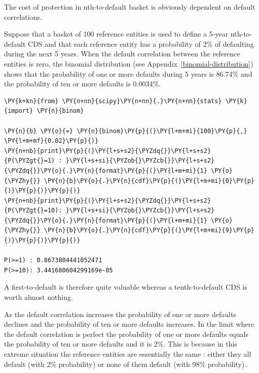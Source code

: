 The cost of protection in nth-to-default basket is obviously dependent on default correlations. 

Suppose that a basket of 100 reference entities is used to define a 5-year nth-to-default CDS and that each reference entity has a probability of 2\% of defaulting during the next
5 years. When the default correlation between the reference entities is zero, the binomial distribution (see Appendix~\ref{binomial-distribution}) 
shows that the probability of one or more defaults during 5 years is 86.74\% and the probability of ten or more defaults is 0.0034\%.

\begin{tcolorbox}[breakable, size=fbox, boxrule=1pt, pad at break*=1mm,colback=cellbackground, colframe=cellborder]
\begin{Verbatim}[commandchars=\\\{\}]
\PY{k+kn}{from} \PY{n+nn}{scipy}\PY{n+nn}{.}\PY{n+nn}{stats} \PY{k}{import} \PY{n}{binom}
	
\PY{n}{b} \PY{o}{=} \PY{n}{binom}\PY{p}{(}\PY{l+m+mi}{100}\PY{p}{,} \PY{l+m+mf}{0.02}\PY{p}{)}
\PY{n+nb}{print}\PY{p}{(}\PY{l+s+s2}{\PYZdq{}}\PY{l+s+s2}{P(\PYZgt{}=1) : }\PY{l+s+si}{\PYZob{}\PYZcb{}}\PY{l+s+s2}{\PYZdq{}}\PY{o}{.}\PY{n}{format}\PY{p}{(}\PY{l+m+mi}{1} \PY{o}{\PYZhy{}} \PY{n}{b}\PY{o}{.}\PY{n}{cdf}\PY{p}{(}\PY{l+m+mi}{0}\PY{p}{)}\PY{p}{)}\PY{p}{)}
\PY{n+nb}{print}\PY{p}{(}\PY{l+s+s2}{\PYZdq{}}\PY{l+s+s2}{P(\PYZgt{}=10): }\PY{l+s+si}{\PYZob{}\PYZcb{}}\PY{l+s+s2}{\PYZdq{}}\PY{o}{.}\PY{n}{format}\PY{p}{(}\PY{l+m+mi}{1} \PY{o}{\PYZhy{}} \PY{n}{b}\PY{o}{.}\PY{n}{cdf}\PY{p}{(}\PY{l+m+mi}{9}\PY{p}{)}\PY{p}{)}\PY{p}{)}
	
P(>=1) : 0.8673804441052471
P(>=10): 3.441680604299169e-05
\end{Verbatim}
\end{tcolorbox}

A first-to-default is therefore quite valuable whereas a tenth-to-default CDS is worth almost nothing.

As the default correlation increases the probability of one or more defaults declines and the probability of ten or more defaults increases. In the limit where the default correlation is perfect the probability of one or more defaults equals the probability of ten or more defaults and it is 2\%. This is because in this extreme situation the reference entities are essentially the same : either they all default (with 2\% probability) or none of them default (with 98\% probability).

